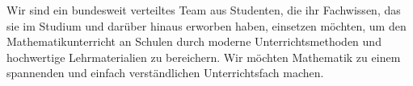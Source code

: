 \documentclass[../main.tex]{subfiles}
\begin{document}
Wir sind ein bundesweit verteiltes Team aus Studenten, die ihr Fachwissen, das sie im Studium und darüber hinaus erworben haben, einsetzen möchten, um den Mathematikunterricht an Schulen durch moderne Unterrichtsmethoden und hochwertige Lehrmaterialien zu bereichern. Wir möchten Mathematik zu einem spannenden und einfach verständlichen Unterrichtsfach machen.
\end{document}
